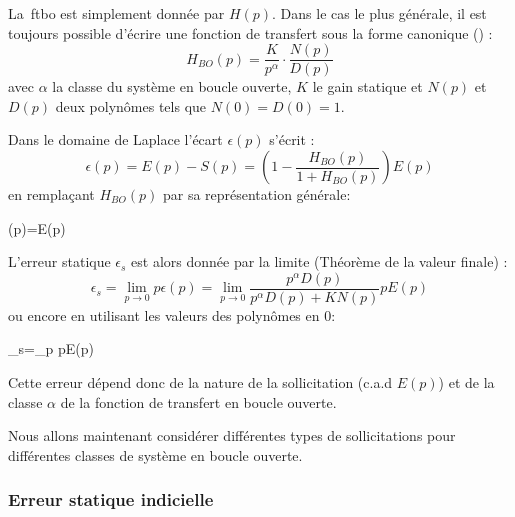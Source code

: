 \begin{center}
\end{center}

La~\gls{ftbo} est simplement donnée par $H(p)$. Dans le cas le plus
générale, il est toujours possible d'écrire une fonction de transfert
sous la forme canonique () :
$$
H_{BO}(p)=\dfrac{K}{p^\alpha}\cdot\dfrac{N(p)}{D(p)}
$$
avec $\alpha$ la classe du système en boucle ouverte, $K$ le gain statique et 
$N(p)$ et $D(p)$ deux polynômes tels que $N(0)=D(0)=1$. 


Dans le domaine de Laplace l'écart $\epsilon(p)$ s'écrit :
$$
\epsilon(p)=E(p)-S(p)=\left(1-\dfrac{H_{BO}(p)}{1+H_{BO}(p)}\right)E(p)
$$
en remplaçant $H_{BO}(p)$ par sa représentation générale:
\begin{bequation}
\epsilon(p)=E(p)
\end{bequation}

L'erreur statique $\epsilon_s$ est alors donnée par la limite (Théorème 
de la valeur finale) :
$$
\epsilon_s=\lim\limits_{p\to 0} p\epsilon(p)=\lim\limits_{p\to 0} 
           \dfrac{p^\alpha D(p)}{p^\alpha D(p)+KN(p)}pE(p) 
$$
ou encore en utilisant les valeurs des polynômes en 0: 
\begin{bequation}
	\epsilon_s=\lim\limits_{p} pE(p)
	\label{eq-erreurStatique}
\end{bequation}

Cette erreur dépend donc de la nature de la sollicitation (c.a.d $E(p)$) et 
de la classe $\alpha$ de la fonction de transfert en boucle ouverte.

Nous allons maintenant considérer différentes types de sollicitations pour 
différentes classes de système en boucle ouverte.

\subsubsection{Erreur statique indicielle}

